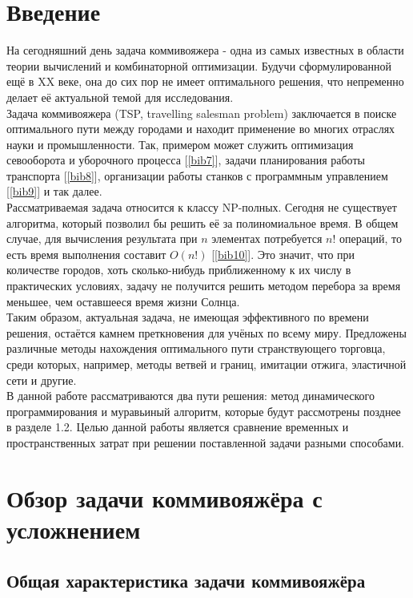 \section*{Введение}
На сегодняшний день задача коммивояжера - одна из самых известных в области теории вычислений и комбинаторной оптимизации. Будучи сформулированной ещё в XX веке, она до сих пор не имеет оптимального решения, что непременно делает её актуальной темой для исследования.\\ 

Задача коммивояжера (TSP, travelling salesman problem) заключается в поиске оптимального пути между городами и находит применение во многих отраслях науки и промышленности. Так, примером может служить оптимизация севооборота и уборочного процесса  [\ref{bib7}], задачи планирования работы транспорта [\ref{bib8}], организации работы станков с программным управлением [\ref{bib9}] и так далее.\\

Рассматриваемая задача относится к классу NP-полных. Сегодня не существует алгоритма, который позволил бы решить её за полиномиальное время. В общем случае, для вычисления результата при $n$ элементах потребуется $n!$ операций, то есть время выполнения составит $O(n!)$ [\ref{bib10}]. Это значит, что при количестве городов, хоть сколько-нибудь приближенному к их числу в практических условиях, задачу не получится решить методом перебора за время меньшее, чем оставшееся время жизни Солнца.\\

Таким образом, актуальная задача, не имеющая эффективного по времени решения, остаётся камнем преткновения для учёных по всему миру. Предложены различные методы нахождения оптимального пути странствующего торговца, среди которых, например, методы ветвей и границ, имитации отжига, эластичной сети и другие. \\

В данной работе рассматриваются два пути решения: метод динамического программирования и муравьиный алгоритм, которые будут рассмотрены позднее в разделе 1.2. Целью данной работы является сравнение временных и пространственных затрат при решении поставленной задачи разными способами.

\section{Обзор задачи коммивояжёра с усложнением}
\subsection{Общая характеристика задачи коммивояжёра}
